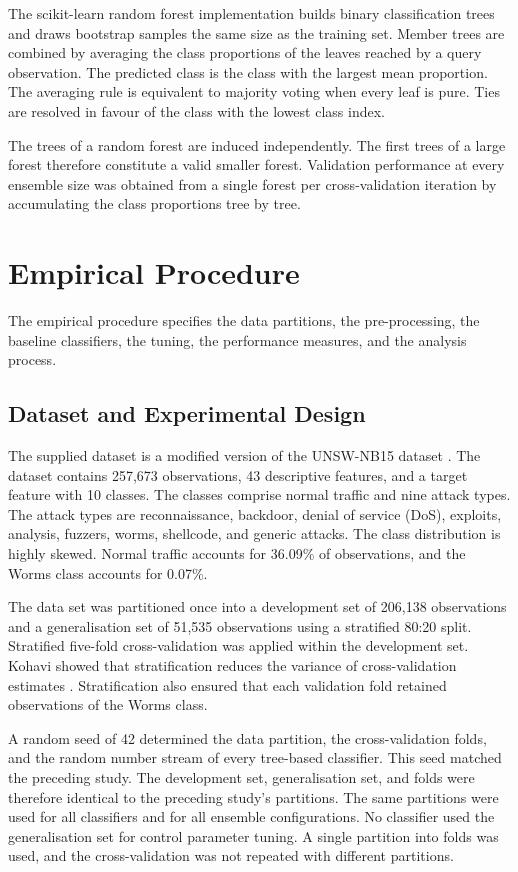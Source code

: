 \documentclass[conference]{IEEEtran}
\begin{document}
The scikit-learn random forest implementation builds binary classification trees and draws bootstrap samples the same size as the training set. Member trees are combined by averaging the class proportions of the leaves reached by a query observation. The predicted class is the class with the largest mean proportion. The averaging rule is equivalent to majority voting when every leaf is pure. Ties are resolved in favour of the class with the lowest class index.

The trees of a random forest are induced independently. The first trees of a large forest therefore constitute a valid smaller forest. Validation performance at every ensemble size was obtained from a single forest per cross-validation iteration by accumulating the class proportions tree by tree.

\section{Empirical Procedure}\label{sec:procedure}

The empirical procedure specifies the data partitions, the pre-processing, the baseline classifiers, the tuning, the performance measures, and the analysis process.

\subsection{Dataset and Experimental Design}

The supplied dataset is a modified version of the UNSW-NB15 dataset \cite{moustafa}. The dataset contains 257,673 observations, 43 descriptive features, and a target feature with 10 classes. The classes comprise normal traffic and nine attack types. The attack types are reconnaissance, backdoor, denial of service (DoS), exploits, analysis, fuzzers, worms, shellcode, and generic attacks. The class distribution is highly skewed. Normal traffic accounts for 36.09\% of observations, and the Worms class accounts for 0.07\%.

The data set was partitioned once into a development set of 206,138 observations and a generalisation set of 51,535 observations using a stratified 80:20 split. Stratified five-fold cross-validation was applied within the development set. Kohavi showed that stratification reduces the variance of cross-validation estimates \cite{kohavi}. Stratification also ensured that each validation fold retained observations of the Worms class.

A random seed of 42 determined the data partition, the cross-validation folds, and the random number stream of every tree-based classifier. This seed matched the preceding study. The development set, generalisation set, and folds were therefore identical to the preceding study's partitions. The same partitions were used for all classifiers and for all ensemble configurations. No classifier used the generalisation set for control parameter tuning. A single partition into folds was used, and the cross-validation was not repeated with different partitions.
\end{document}

